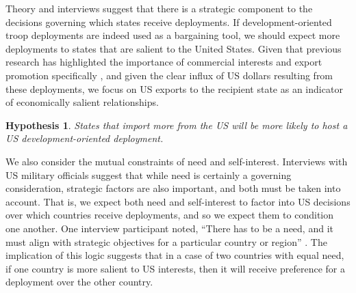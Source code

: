 \documentclass[12pt]{article}
\newtheorem{hyp}{Hypothesis}
\begin{document}
\begin{doublespace}
Theory and interviews suggest that there is a strategic component to the decisions governing which states receive deployments. If development-oriented troop deployments are indeed used as a bargaining tool, we should expect more deployments to states that are salient to the United States. Given that previous research has highlighted the importance of commercial interests and export promotion specifically \cite{FleckKilby2006,MilnerTingley2010}, and given the clear influx of US dollars resulting from these deployments, we focus on US exports to the recipient state as an indicator of economically salient relationships.    


\begin{hyp}
States that import more from the US will be more likely to host a US development-oriented deployment.
\end{hyp}


We also consider the mutual constraints of need and self-interest. Interviews with US military officials suggest that while need is certainly a governing consideration, strategic factors are also important, and both must be taken into account. That is, we expect both need and self-interest to factor into US decisions over which countries receive deployments, and so we expect them to condition one another.  One interview participant noted, ``There has to be a need, and it must align with strategic objectives for a particular country or region'' \cite{CPT20160309}. The implication of this logic suggests that in a case of two countries with equal need, if one country is more salient to US interests, then it will receive preference for a deployment over the other country.



\end{doublespace}
\end{document}
